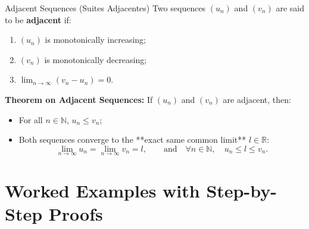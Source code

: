 \begin{definitionbox}{Adjacent Sequences (Suites Adjacentes)}
Two sequences $(u_n)$ and $(v_n)$ are said to be \textbf{adjacent} if:
\begin{enumerate}[leftmargin=1.4em,itemsep=2pt]
  \item $(u_n)$ is monotonically increasing;
  \item $(v_n)$ is monotonically decreasing;
  \item $\lim_{n \to \infty} (v_n - u_n) = 0$.
\end{enumerate}
\textbf{Theorem on Adjacent Sequences:}
If $(u_n)$ and $(v_n)$ are adjacent, then:
\begin{itemize}[leftmargin=1.4em,itemsep=1pt]
  \item For all $n \in \mathbb{N}$, $u_n \le v_n$;
  \item Both sequences converge to the **exact same common limit** $l \in \mathbb{R}$:
  \[
  \lim_{n \to \infty} u_n = \lim_{n \to \infty} v_n = l, \qquad \text{and} \quad \forall n \in \mathbb{N}, \quad u_n \le l \le v_n.
  \]
\end{itemize}
\end{definitionbox}

\section{Worked Examples with Step-by-Step Proofs}

